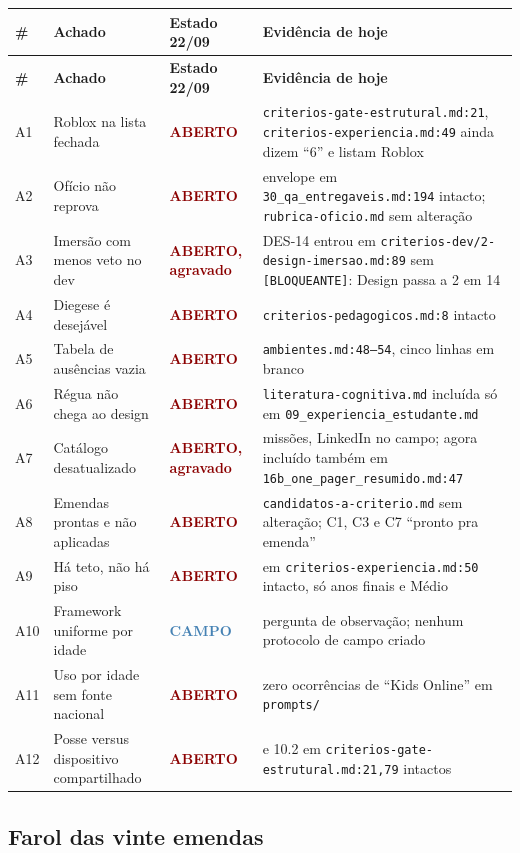 \documentclass[11pt,a4paper]{article}
\newcommand{\aberto}{\textcolor{DarkRed}{\textbf{ABERTO}}}
\newcommand{\agravado}{\textcolor{DarkRed}{\textbf{ABERTO, agravado}}}
\newcommand{\campo}{\textcolor{SteelBlue}{\textbf{CAMPO}}}
\begin{document}
\small\begin{longtable}{@{}p{0.7cm} >{\raggedright\arraybackslash}p{4.4cm} p{2.5cm} >{\raggedright\arraybackslash}p{7.0cm}@{}}
\toprule
\textbf{\#} & \textbf{Achado} & \textbf{Estado 22/09} & \textbf{Evidência de hoje} \\
\midrule
\endfirsthead
\toprule
\textbf{\#} & \textbf{Achado} & \textbf{Estado 22/09} & \textbf{Evidência de hoje} \\
\midrule
\endhead
\bottomrule
\endfoot
A1 & Roblox na lista fechada & \aberto & \texttt{criterios-gate-estrutural.md:21}, \texttt{criterios-experiencia.md:49} ainda dizem ``6'' e listam Roblox \\
A2 & Ofício não reprova & \aberto & envelope em \texttt{30\_qa\_entregaveis.md:194} intacto; \texttt{rubrica-oficio.md} sem alteração \\
A3 & Imersão com menos veto no dev & \agravado & DES-14 entrou em \texttt{criterios-dev/2-design-imersao.md:89} sem \texttt{[BLOQUEANTE]}: Design passa a 2 em 14 \\
A4 & Diegese é desejável & \aberto & \texttt{criterios-pedagogicos.md:8} intacto \\
A5 & Tabela de ausências vazia & \aberto & \texttt{ambientes.md:48--54}, cinco linhas em branco \\
A6 & Régua não chega ao design & \aberto & \texttt{literatura-cognitiva.md} incluída só em \texttt{09\_experiencia\_estudante.md} \\
A7 & Catálogo desatualizado & \agravado & 3 missões, LinkedIn no campo; agora incluído também em \texttt{16b\_one\_pager\_resumido.md:47} \\
A8 & Emendas prontas e não aplicadas & \aberto & \texttt{candidatos-a-criterio.md} sem alteração; C1, C3 e C7 ``pronto pra emenda'' \\
A9 & Há teto, não há piso & \aberto & 6.5 em \texttt{criterios-experiencia.md:50} intacto, só anos finais e Médio \\
A10 & Framework uniforme por idade & \campo & pergunta de observação; nenhum protocolo de campo criado \\
A11 & Uso por idade sem fonte nacional & \aberto & zero ocorrências de ``Kids Online'' em \texttt{prompts/} \\
A12 & Posse versus dispositivo compartilhado & \aberto & 2.1 e 10.2 em \texttt{criterios-gate-estrutural.md:21,79} intactos \\
\end{longtable}\normalsize

\subsection{Farol das vinte emendas}
\end{document}
